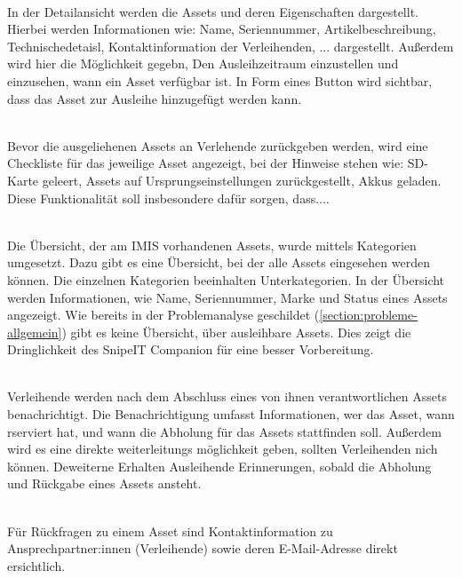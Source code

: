     {\sffamily\color{maincolor}{Ft-A-6 | Detailsansicht }}\\
In der Detailansicht werden die Assets und deren Eigenschaften dargestellt.
Hierbei werden Informationen wie: Name, Seriennummer, Artikelbeschreibung,
Technischedetaisl, Kontaktinformation der Verleihenden, ... dargestellt.
Außerdem wird hier die Möglichkeit gegebn, Den Ausleihzeitraum einzustellen und
einzusehen, wann ein Asset verfügbar ist. In Form eines Button wird sichtbar,
dass das Asset zur Ausleihe hinzugefügt werden kann.

    {\sffamily\color{maincolor}{Ft-A-7 | Rückgabe-Checkliste}}\\
Bevor die ausgeliehenen Assets an Verlehende zurückgeben werden, wird eine
Checkliste für das jeweilige Asset angezeigt, bei der Hinweise stehen wie:
SD-Karte geleert, Assets auf Ursprungseinstellungen zurückgestellt, Akkus
geladen. Diese Funktionalität soll insbesondere dafür sorgen, dass....

    {\sffamily\color{maincolor}{Ft-VA-1 | Übersicht über ausleihbare Assets }}\\
Die Übersicht, der am IMIS vorhandenen Assets, wurde mittels Kategorien
umgesetzt. Dazu gibt es eine Übersicht, bei der alle Assets eingesehen werden
können. Die einzelnen Kategorien beeinhalten Unterkategorien. In der Übersicht
werden Informationen, wie Name, Seriennummer, Marke und Status eines Assets
angezeigt. Wie bereits in der Problemanalyse geschildet
(\ref{section:probleme-allgemein}) gibt es keine Übersicht, über ausleihbare
Assets. Dies zeigt die Dringlichkeit des SnipeIT Companion für eine besser
Vorbereitung.

    {\sffamily\color{maincolor}{Ft-VA-2 | Benachrichtigungen \& Erinnerungen
        }}\\
Verleihende werden nach dem Abschluss eines von ihnen verantwortlichen Assets
benachrichtigt. Die Benachrichtigung umfasst Informationen, wer das Asset, wann
rserviert hat, und wann die Abholung für das Assets stattfinden soll. Außerdem
wird es eine direkte weiterleitungs möglichkeit geben, sollten Verleihenden nich
können. Deweiterne Erhalten Ausleihende Erinnerungen, sobald die Abholung und
Rückgabe eines Assets ansteht.

    {\sffamily\color{maincolor}{Ft-VA-3 | Sichtbarkeit von
            Ansprechpartner:innen}}\\
Für Rückfragen zu einem Asset sind Kontaktinformation zu Ansprechpartner:innen
(Verleihende) sowie deren E-Mail-Adresse direkt ersichtlich.


